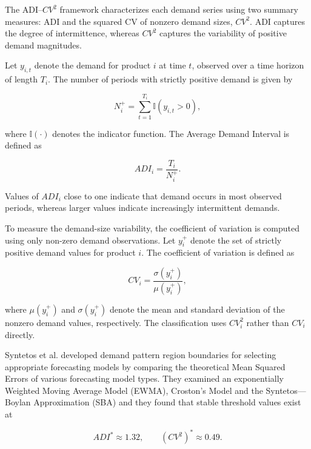 The \ac{ADI}--$CV^2$ framework characterizes each demand series using two summary measures: \ac{ADI} and the squared \ac{CV} of nonzero demand sizes, $CV^2$. \ac{ADI} captures the degree of intermittence, whereas $CV^2$ captures the variability of positive demand magnitudes.

Let $y_{i,t}$ denote the demand for product $i$ at time $t$, observed over a time horizon of length $T_i$. The number of periods with strictly positive demand is given by

\begin{equation}
    N_i^{+} = \sum_{t=1}^{T_i} \mathbb{I}(y_{i,t} > 0),
    \label{eq:n_positive_demand_ch2}
\end{equation}

where $\mathbb{I}(\cdot)$ denotes the indicator function. The Average Demand Interval is defined as

\begin{equation}
    ADI_i = \frac{T_i}{N_i^{+}}.
    \label{eq:adi_ch2}
\end{equation}

Values of $ADI_i$ close to one indicate that demand occurs in most observed periods, whereas larger values indicate increasingly intermittent demands.

To measure the demand-size variability, the coefficient of variation is computed using only non-zero demand observations. Let $y_i^{+}$ denote the set of strictly positive demand values for product $i$. The coefficient of variation is defined as

\begin{equation}
    CV_i = \frac{\sigma(y_i^{+})}{\mu(y_i^{+})},
    \label{eq:cv_ch2}
\end{equation}

where $\mu(y_i^{+})$ and $\sigma(y_i^{+})$ denote the mean and standard deviation of the nonzero demand values, respectively. The classification uses $CV_i^2$ rather than $CV_i$ directly.

Syntetos et al. developed demand pattern region boundaries for selecting appropriate forecasting models by comparing the theoretical Mean Squared Errors of various forecasting model types. They examined an exponentially Weighted Moving Average Model (EWMA), Croston’s Model and the Syntetos—Boylan Approximation (SBA) and they found that stable threshold values exist at

\begin{equation}
    ADI^* \approx 1.32,
    \qquad
    (CV^2)^* \approx 0.49.
    \label{eq:adi_cv2_cutoffs_ch2}
\end{equation}

